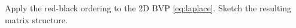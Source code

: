   Apply the red-black ordering to the 2D \ac{BVP} \eqref{eq:laplace}.
  Sketch the resulting matrix structure.
